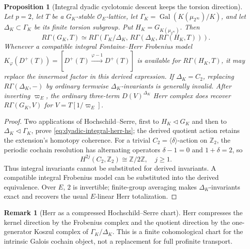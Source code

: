 \documentclass[11pt]{article}
\newtheorem{proposition}[theorem]{Proposition}
\theoremstyle{definition}
\newtheorem{remark}[theorem]{Remark}
\begin{document}
\begin{proposition}[Integral dyadic cyclotomic descent keeps the torsion direction]
\label{prop:dyadic-integral-herr-derived}
Let $p=2$, let $T$ be a $G_K$-stable $\mathcal O_E$-lattice,
let $\Gamma_K=\operatorname{Gal}(K(\mu_{2^\infty})/K)$,
and let $\Delta_K\subset\Gamma_K$ be its finite torsion subgroup.
Put $H_K=G_{K(\mu_{2^\infty})}$.  Then
\begin{equation}\label{eq:dyadic-integral-herr-hs}
R\Gamma(G_K,T)\simeq
R\Gamma\!\left(\Gamma_K/\Delta_K,\,
 R\Gamma\!\left(\Delta_K,R\Gamma(H_K,T)\right)\right).
\end{equation}
Whenever a compatible integral Fontaine--Herr Frobenius model
$K_\varphi(D^+(T))
=[D^+(T)\xrightarrow{\varphi-1}D^+(T)]$
is available for $R\Gamma(H_K,T)$, it may replace the
innermost factor in this derived expression.
If $\Delta_K=C_2$, replacing $R\Gamma(\Delta_K,-)$ by
ordinary termwise $\Delta_K$-invariants is generally invalid.
After inverting $\varpi_E$, the ordinary three-term
$D(V)^{\Delta_K}$ Herr complex does recover
$R\Gamma(G_K,V)$ for $V=T[1/\varpi_E]$.
\end{proposition}

\begin{proof}
Two applications of Hochschild--Serre, first to $H_K\triangleleft G_K$
and then to $\Delta_K\triangleleft\Gamma_K$, prove
\eqref{eq:dyadic-integral-herr-hs}; the derived quotient action
retains the extension's homotopy coherence.
For a trivial $C_2=\langle\delta\rangle$-action on $\mathbb Z_2$,
the periodic cochain resolution has alternating operators
$\delta-1=0$ and $1+\delta=2$, so
\[
H^{2j}(C_2,\mathbb Z_2)\cong\mathbb Z/2\mathbb Z,
\quad j\ge1.
\]
Thus integral invariants cannot be substituted for
derived invariants.  A compatible integral Frobenius model
can be substituted into the derived equivalence.
Over $E$, $2$ is invertible; finite-group averaging makes
$\Delta_K$-invariants exact and recovers the usual
$E$-linear Herr totalization.
\end{proof}

\begin{remark}[Herr as a compressed Hochschild--Serre chart]\label{rem:herr-wall-compression}
Herr compresses the kernel direction by the Frobenius complex and the quotient direction by the one-generator Koszul complex of $\Gamma_K/\Delta_K$.  This is a finite cohomological chart for the intrinsic Galois cochain object, not a replacement for full profinite transport.
\end{remark}
\end{document}
